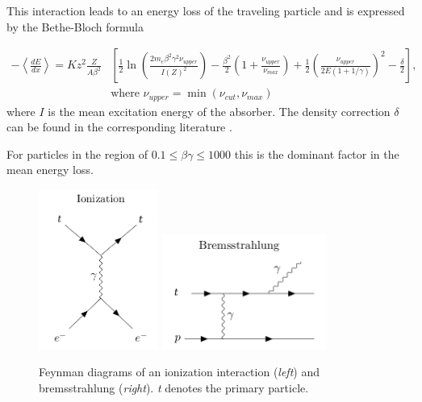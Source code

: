 This interaction leads to an energy loss of the traveling particle and is expressed by the Bethe-Bloch formula \cite{PDG2018url}

\begin{equation}
\label{eq:ioniz}
\begin{split}
-\left\langle\frac{dE}{dx}\right\rangle = K z^2 \frac{Z}{A \beta^2} &\left[\frac{1}{2} \ln \left(\frac{2 m_e \beta^2 \gamma^2 \nu_{upper}}{I\left(Z\right)^2} \right) -\frac{\beta^2}{2}  \left(1+\frac{\nu_{upper}}{\nu_{max}} \right) + \frac{1}{2} \left( \frac{\nu_{upper}}{2E(1+1/\gamma)}\right)^2 - \frac{\delta}{2}\right], \\ 
&\textrm{where } \nu_{upper} = \min(\nu_{cut},\nu_{max}) 
\end{split}
\end{equation} 
where $I$ is the mean excitation energy of the absorber. The density correction $\delta$ can be found in the corresponding literature \cite{Chirkin:2004hz}.

For particles in the region of $0.1 \leq \beta \gamma \leq 1000$ this is the dominant factor in the mean energy loss. 

\begin{figure}
\centering
\includegraphics[width = 0.35\textwidth]{chapter4/img/Feynman_Ionization_2.png}
\includegraphics[width = 0.48\textwidth]{chapter4/img/Feynman_Bremsstrahlung_2.png}
\caption{Feynman diagrams of an ionization interaction (\textit{left}) and bremsstrahlung (\textit{right}). \textit{t} denotes the primary particle.}
\label{fig:feynmanionizbrems}
\end{figure}


